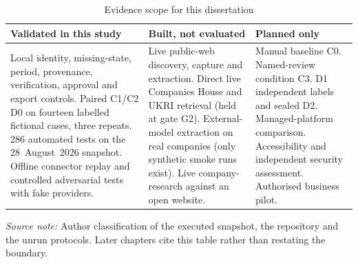 \begin{table}[htbp]
  \centering
  \small
  \setlength{\tabcolsep}{3pt}
  \renewcommand{\arraystretch}{1.12}
  \begin{tabularx}{\textwidth}{@{}P{0.30\textwidth}P{0.34\textwidth}Y@{}}
    \toprule
    \textbf{Validated in this study} &
    \textbf{Built, not evaluated} &
    \textbf{Planned only} \\
    \midrule
    Local identity, missing-state, period, provenance, verification, approval and export controls.
    Paired C1/C2 D0 on fourteen labelled fictional cases, three repeats.
    286 automated tests on the 28~August~2026 snapshot.
    Offline connector replay and controlled adversarial tests with fake providers. &
    Live public-web discovery, capture and extraction.
    Direct live Companies House and UKRI retrieval (held at gate G2).
    External-model extraction on real companies (only synthetic smoke runs exist).
    Live company-research against an open website. &
    Manual baseline C0.
    Named-review condition C3.
    D1 independent labels and sealed D2.
    Managed-platform comparison.
    Accessibility and independent security assessment.
    Authorised business pilot. \\
    \bottomrule
  \end{tabularx}
  \caption{Evidence scope for this dissertation}
  \label{tab:meth-evidence-scope}
  \vspace{3pt}
  \parbox{\textwidth}{\scriptsize
    \textit{Source note:} Author classification of the executed snapshot, the repository and the
    unrun protocols. Later chapters cite this table rather than restating the boundary.}
\end{table}
